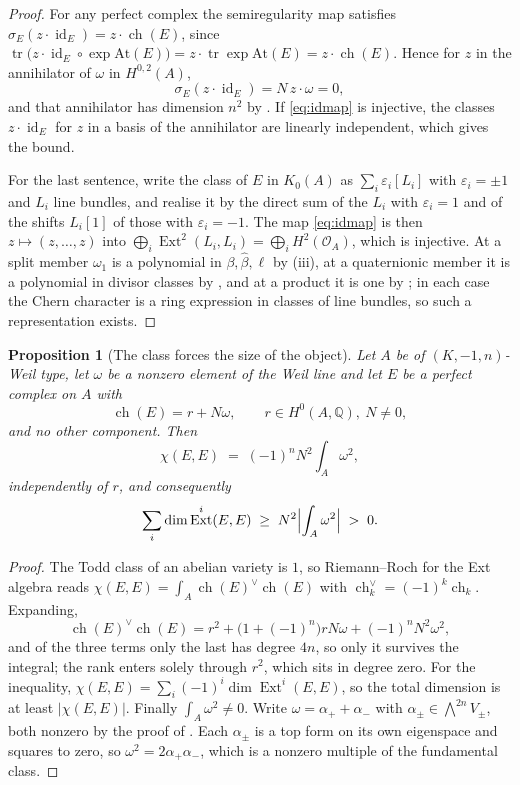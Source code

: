 \documentclass[11pt,reqno]{amsart}
\theoremstyle{plain}
\newtheorem{proposition}[theorem]{Proposition}
\theoremstyle{definition}
\theoremstyle{remark}
\newcommand{\QQ}{\mathbb{Q}}
\newcommand{\cO}{\mathcal{O}}
\DeclareMathOperator{\ch}{ch}
\DeclareMathOperator{\Ext}{Ext}
\DeclareMathOperator{\id}{id}
\begin{document}
\begin{proof}
For any perfect complex the semiregularity map satisfies
$\sigma_{E}(z\cdot\id_{E})=z\cdot\ch(E)$, since
$\operatorname{tr}\bigl(z\cdot\id_{E}\circ\exp\mathrm{At}(E)\bigr)
=z\cdot\operatorname{tr}\exp\mathrm{At}(E)=z\cdot\ch(E)$. Hence for $z$ in the
annihilator of $\omega$ in $H^{0,2}(A)$,
\[
  \sigma_{E}(z\cdot\id_{E})=N\,z\cdot\omega=0 ,
\]
and that annihilator has dimension $n^{2}$ by . If
\eqref{eq:idmap} is injective, the classes $z\cdot\id_{E}$ for $z$ in a basis
of the annihilator are linearly independent, which gives the bound.

For the last sentence, write the class of $E$ in $K_{0}(A)$ as
$\sum_{i}\varepsilon_{i}[L_{i}]$ with $\varepsilon_{i}=\pm1$ and $L_{i}$ line
bundles, and realise it by the direct sum of the $L_{i}$ with
$\varepsilon_{i}=1$ and of the shifts $L_{i}[1]$ of those with
$\varepsilon_{i}=-1$. The map \eqref{eq:idmap} is then $z\mapsto(z,\dots,z)$
into $\bigoplus_{i}\Ext^{2}(L_{i},L_{i})=\bigoplus_{i}H^{2}(\cO_{A})$, which is
injective. At a split member $\omega_{1}$ is a polynomial in
$\beta,\widehat\beta,\ell$ by (iii), at a quaternionic
member it is a polynomial in divisor classes by , and at a
product it is one by ; in each case the Chern character is a
ring expression in classes of line bundles, so such a representation exists.
\end{proof}

\begin{proposition}[The class forces the size of the object]%
\label{prop:objectsize}
Let $A$ be of $(K,-1,n)$-Weil type, let $\omega$ be a nonzero element of the
Weil line and let $E$ be a perfect complex on $A$ with
\[
  \ch(E)=r+N\omega,\qquad r\in H^{0}(A,\QQ),\ N\ne0,
\]
and no other component. Then
\[
  \chi(E,E)\;=\;(-1)^{n}N^{2}\!\int_{A}\omega^{2},
\]
independently of $r$, and consequently
\[
  \sum_{i}\dim\Ext^{i}(E,E)\;\ge\;N^{2}\Bigl|\int_{A}\omega^{2}\Bigr|\;>\;0 .
\]
\end{proposition}

\begin{proof}
The Todd class of an abelian variety is $1$, so Riemann--Roch for the Ext
algebra reads $\chi(E,E)=\int_{A}\ch(E)^{\vee}\ch(E)$ with
$\ch_{k}^{\vee}=(-1)^{k}\ch_{k}$. Expanding,
\[
  \ch(E)^{\vee}\ch(E)
  = r^{2}+\bigl(1+(-1)^{n}\bigr)rN\omega+(-1)^{n}N^{2}\omega^{2},
\]
and of the three terms only the last has degree $4n$, so only it survives the
integral; the rank enters solely through $r^{2}$, which sits in degree zero.
For the inequality, $\chi(E,E)=\sum_{i}(-1)^{i}\dim\Ext^{i}(E,E)$, so the
total dimension is at least $|\chi(E,E)|$. Finally $\int_{A}\omega^{2}\ne0$.
Write $\omega=\alpha_{+}+\alpha_{-}$ with $\alpha_{\pm}\in\bigwedge^{2n}V_{\pm}$,
both nonzero by the proof of . Each $\alpha_{\pm}$ is a
top form on its own eigenspace and squares to zero, so
$\omega^{2}=2\alpha_{+}\alpha_{-}$, which is a nonzero multiple of the
fundamental class.
\end{proof}
\end{document}
